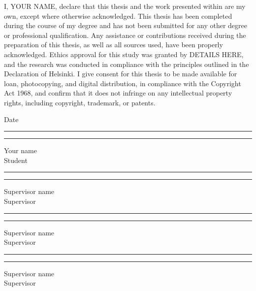 
\justify
I, YOUR NAME, declare that this thesis and the work presented within are my own, except where otherwise acknowledged. This thesis has been completed during the course of my degree and has not been submitted for any other degree or professional qualification. Any assistance or contributions received during the preparation of this thesis, as well as all sources used, have been properly acknowledged. Ethics approval for this study was granted by DETAILS HERE, and the research was conducted in compliance with the principles outlined in the Declaration of Helsinki. I give consent for this thesis to be made available for loan, photocopying, and digital distribution, in compliance with the Copyright Act 1968, and confirm that it does not infringe on any intellectual property rights, including copyright, trademark, or patents.

\vspace{1\baselineskip}

\begin{flushright}
    Date
\end{flushright}

\vspace{1\baselineskip}

\noindent\rule{4in}{0.7pt} \hfill \rule{1.5in}{0.7pt}

\noindent Your name\\
Student

\vspace{1.5\baselineskip}

\noindent\rule{4in}{0.7pt} \hfill \rule{1.5in}{0.7pt}

\noindent Supervisor name\\
Supervisor

\vspace{1.5\baselineskip}

\noindent\rule{4in}{0.7pt} \hfill \rule{1.5in}{0.7pt}

\noindent Supervisor name\\
Supervisor

\vspace{1.5\baselineskip}

\noindent\rule{4in}{0.7pt} \hfill \rule{1.5in}{0.7pt}

\noindent Supervisor name\\
Supervisor